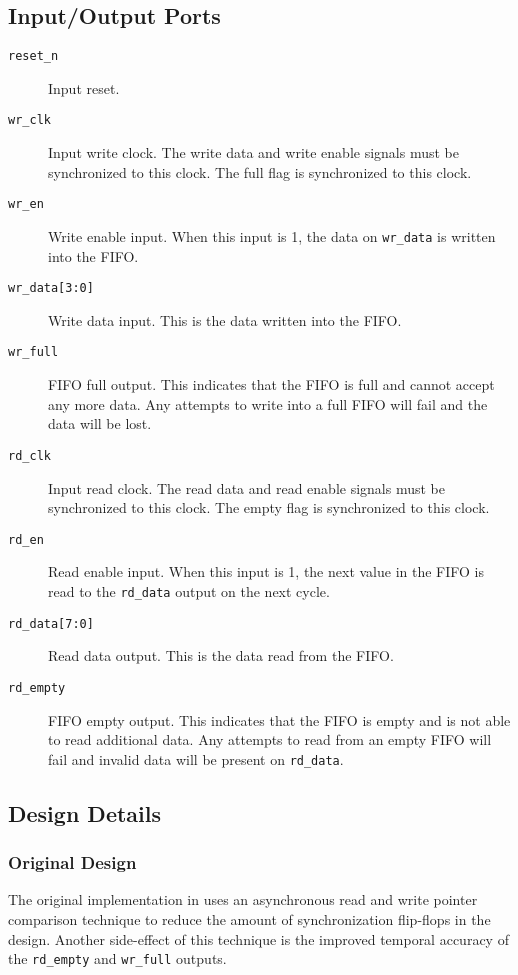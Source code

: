 \subsection{Input/Output Ports}
\begin{description}
	\item[\texttt{reset\_n}] Input reset.
	\item[\texttt{wr\_clk}] Input write clock. The write data and write enable signals must be synchronized to this clock. The full flag is synchronized to this clock.
	\item[\texttt{wr\_en}] Write enable input. When this input is 1, the data on \texttt{wr\_data} is written into the FIFO.
	\item[\texttt{wr\_data[3:0]}] Write data input. This is the data written into the FIFO.
	\item[\texttt{wr\_full}] FIFO full output. This indicates that the FIFO is full and cannot accept any more data. Any attempts to write into a full FIFO will fail and the data will be lost.
	\item[\texttt{rd\_clk}] Input read clock. The read data and read enable signals must be synchronized to this clock. The empty flag is synchronized to this clock.
	\item[\texttt{rd\_en}] Read enable input. When this input is 1, the next value in the FIFO is read to the \texttt{rd\_data} output on the next cycle.
	\item[\texttt{rd\_data[7:0]}] Read data output. This is the data read from the FIFO.
	\item[\texttt{rd\_empty}] FIFO empty output. This indicates that the FIFO is empty and is not able to read additional data. Any attempts to read from an empty FIFO will fail and invalid data will be present on \texttt{rd\_data}.
\end{description}

\subsection{Design Details}
\subsubsection{Original Design}
The original implementation in \cite{async-fifo} uses an asynchronous read and write pointer comparison technique to reduce the amount of synchronization flip-flops in the design. Another side-effect of this technique is the improved temporal accuracy of the \texttt{rd\_empty} and \texttt{wr\_full} outputs.

